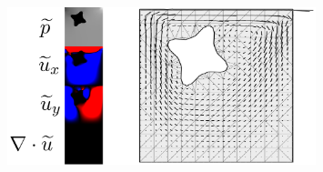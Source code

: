 \begin{figure}[H]
    \centering
    \centerline{\includegraphics[width=0.8\textwidth]{figures/stokes/lid_driven_obstruction/figure.png}}
    \label{stokes_lid_driven_obstruction}
\end{figure}


% 
% 
% 
